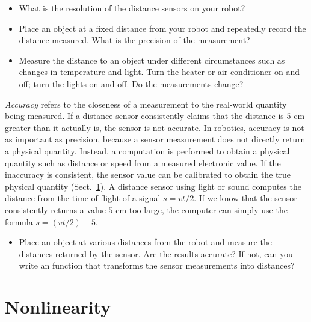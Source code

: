 \begin{framed}
\begin{itemize}
\item What is the resolution of the distance sensors on your robot?
\item Place an object at a fixed distance from your robot and repeatedly record the distance measured. What is the precision of the measurement?
\item Measure the distance to an object under different circumstances such as changes in temperature and light. Turn the heater or air-conditioner on and off; turn the lights on and off. Do the measurements change?
\end{itemize}
\end{framed}

\emph{Accuracy} refers to the closeness of a measurement to the real-world quantity being measured. If a distance sensor consistently claims that the distance is $5$ cm greater than it actually is, the sensor is not accurate. In robotics, accuracy is not as important as precision, because a sensor measurement does not directly return a physical quantity. Instead, a computation is performed to obtain a physical quantity such as distance or speed from a measured electronic value. If the inaccuracy is consistent, the sensor value can be calibrated to obtain the true physical quantity (Sect.~\ref{s.nonlinearity}). A distance sensor using light or sound computes the distance from the time of flight of a signal $s=vt/2$. If we know that the sensor consistently returns a value $5$ cm too large, the computer can simply use the formula $s=(vt/2) - 5$.

\begin{framed}
\begin{itemize}
\item Place an object at various distances from the robot and measure the distances returned by the sensor. Are the results accurate? If not, can you write an function that transforms the sensor measurements into distances?
\end{itemize}
\end{framed}

\section{Nonlinearity}\label{s.nonlinearity}

